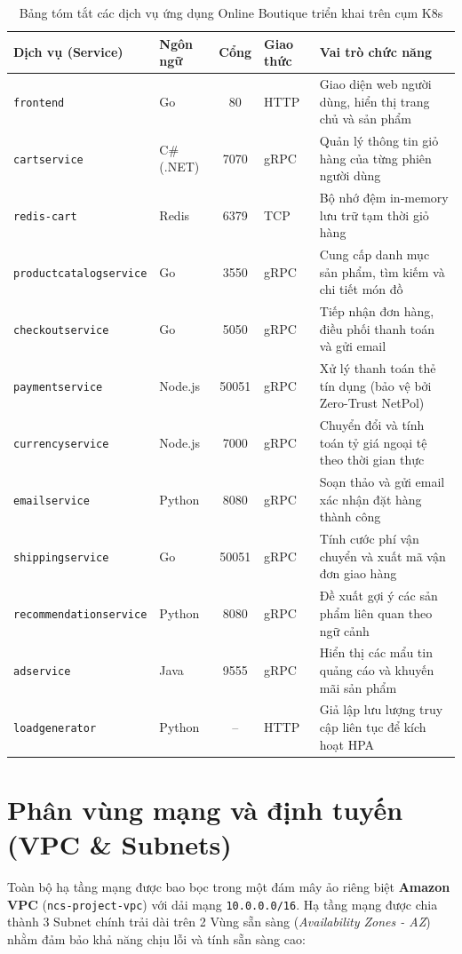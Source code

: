 \begin{table}[H]
    \centering
    \small
    \renewcommand{\arraystretch}{1.2}
    \caption{Bảng tóm tắt các dịch vụ ứng dụng Online Boutique triển khai trên cụm K8s}
    \label{tab:services_summary}
    \begin{tabularx}{\textwidth}{l l c l X}
        \toprule
        \textbf{Dịch vụ (Service)} & \textbf{Ngôn ngữ} & \textbf{Cổng} & \textbf{Giao thức} & \textbf{Vai trò chức năng} \\
        \midrule
        \texttt{frontend} & Go & 80 & HTTP & Giao diện web người dùng, hiển thị trang chủ và sản phẩm \\
        \texttt{cartservice} & C\# (.NET) & 7070 & gRPC & Quản lý thông tin giỏ hàng của từng phiên người dùng \\
        \texttt{redis-cart} & Redis & 6379 & TCP & Bộ nhớ đệm in-memory lưu trữ tạm thời giỏ hàng \\
        \texttt{productcatalogservice} & Go & 3550 & gRPC & Cung cấp danh mục sản phẩm, tìm kiếm và chi tiết món đồ \\
        \texttt{checkoutservice} & Go & 5050 & gRPC & Tiếp nhận đơn hàng, điều phối thanh toán và gửi email \\
        \texttt{paymentservice} & Node.js & 50051 & gRPC & Xử lý thanh toán thẻ tín dụng (bảo vệ bởi Zero-Trust NetPol) \\
        \texttt{currencyservice} & Node.js & 7000 & gRPC & Chuyển đổi và tính toán tỷ giá ngoại tệ theo thời gian thực \\
        \texttt{emailservice} & Python & 8080 & gRPC & Soạn thảo và gửi email xác nhận đặt hàng thành công \\
        \texttt{shippingservice} & Go & 50051 & gRPC & Tính cước phí vận chuyển và xuất mã vận đơn giao hàng \\
        \texttt{recommendationservice} & Python & 8080 & gRPC & Đề xuất gợi ý các sản phẩm liên quan theo ngữ cảnh \\
        \texttt{adservice} & Java & 9555 & gRPC & Hiển thị các mẩu tin quảng cáo và khuyến mãi sản phẩm \\
        \texttt{loadgenerator} & Python & -- & HTTP & Giả lập lưu lượng truy cập liên tục để kích hoạt HPA \\
        \bottomrule
    \end{tabularx}
\end{table}

\section{Phân vùng mạng và định tuyến (VPC \& Subnets)}
Toàn bộ hạ tầng mạng được bao bọc trong một đám mây ảo riêng biệt \textbf{Amazon VPC} (\texttt{ncs-project-vpc}) với dải mạng \texttt{10.0.0.0/16}. Hạ tầng mạng được chia thành 3 Subnet chính trải dài trên 2 Vùng sẵn sàng (\textit{Availability Zones - AZ}) nhằm đảm bảo khả năng chịu lỗi và tính sẵn sàng cao:

